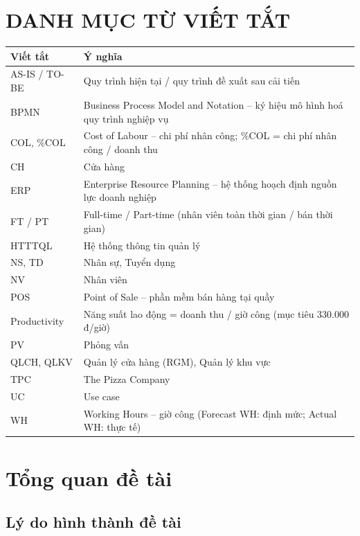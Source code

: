 \documentclass[12pt,a4paper,oneside]{report}
\begin{document}
\chapter*{DANH MỤC TỪ VIẾT TẮT}
\begin{longtable}{L{3cm}L{11.5cm}}
\toprule \textbf{Viết tắt} & \textbf{Ý nghĩa} \\\midrule\endhead
AS-IS / TO-BE & Quy trình hiện tại / quy trình đề xuất sau cải tiến \\
BPMN & Business Process Model and Notation – ký hiệu mô hình hoá quy trình nghiệp vụ \\
COL, \%COL & Cost of Labour – chi phí nhân công; \%COL = chi phí nhân công / doanh thu \\
CH & Cửa hàng \\
ERP & Enterprise Resource Planning – hệ thống hoạch định nguồn lực doanh nghiệp \\
FT / PT & Full-time / Part-time (nhân viên toàn thời gian / bán thời gian) \\
HTTTQL & Hệ thống thông tin quản lý \\
NS, TD & Nhân sự, Tuyển dụng \\
NV & Nhân viên \\
POS & Point of Sale – phần mềm bán hàng tại quầy \\
Productivity & Năng suất lao động = doanh thu / giờ công (mục tiêu 330.000 đ/giờ) \\
PV & Phỏng vấn \\
QLCH, QLKV & Quản lý cửa hàng (RGM), Quản lý khu vực \\
TPC & The Pizza Company \\
UC & Use case \\
WH & Working Hours – giờ công (Forecast WH: định mức; Actual WH: thực tế) \\
\bottomrule
\end{longtable}

\clearpage
{}

\chapter{Tổng quan đề tài}

\section{Lý do hình thành đề tài}
\end{document}
